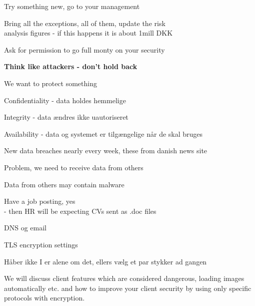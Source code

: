 \documentclass[Screen16to9,17pt]{foils}
\begin{document}
Try something new, go to your management

Bring all the exceptions, all of them, update the risk \\
analysis figures - if this happens it is about 1mill DKK

Ask for permission to go full monty on your security

{\bf Think like attackers - don't hold back}




\begin{list1}
\item We want to protect something
\item Confidentiality - data holdes hemmelige
\item Integrity - data ændres ikke uautoriseret
\item Availability - data og systemet er tilgængelige når de skal bruges
\end{list1}




New data breaches nearly every week, these from danish news site 

Problem, we need to receive data from others

Data from others may contain malware

Have a job posting, yes\\
- then HR will be expecting CVs sent as .doc files




\begin{list2}
\item DNS og email
\item TLS encryption settings
\end{list2}

\vskip 5mm
\centerline{Håber ikke I er alene om det, ellers vælg et par stykker ad gangen}




We will discuss client features which are considered dangerous, loading images automatically etc. and how to improve your client security by using only specific protocols with encryption.
\end{document}
